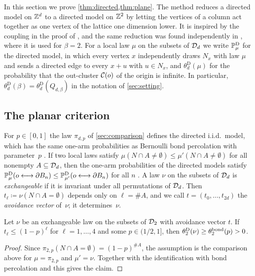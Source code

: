 \documentclass[11pt,letterpaper]{article}
\begin{document}
In this section we prove \cref{thm:directed,thm:plane}. The method reduces a directed model on $\Z^d$ to a directed model on $\Z^2$ by letting the vertices of a column act together as one vertex of the lattice one dimension lower. It is inspired by the coupling in the proof of \cite[Theorem~2.3]{JKLT25}, and the same reduction was found independently in \cite{LXZ26}, where it is used for $\beta=2$. For a local law $\mu$ on the subsets of $\cD_d$ we write $\P^{\mathrm D}_\mu$ for the directed model, in which every vertex $x$ independently draws $N_x$ with law $\mu$ and sends a directed edge to every $x+u$ with $u\in N_x$, and $\theta^{\mathrm D}_d(\mu)$ for the probability that the out-cluster $\cC(o)$ of the origin is infinite. In particular, $\theta^{\mathrm D}_d(\beta)=\theta^{\mathrm D}_d(Q_{d,\beta})$ in the notation of \cref{sec:setting}.

\subsection{The planar criterion}

For $p\in[0,1]$ the law $\pi_{d,p}$ of \cref{sec:comparison} defines the directed i.i.d.\ model, which has the same one-arm probabilities as Bernoulli bond percolation with parameter~$p$ \cite[Lemma~3.5]{BJKLRT25}. If two local laws satisfy $\mu(N\cap A\neq\emptyset)\le\mu'(N\cap A\neq\emptyset)$ for all nonempty $A\subseteq\cD_d$, then the one-arm probabilities of the directed models satisfy $\P^{\mathrm D}_\mu(o\lra\partial B_n)\le\P^{\mathrm D}_{\mu'}(o\lra\partial B_n)$ for all $n$ \cite[Theorem~2.1]{BJKLRT25}. A law $\nu$ on the subsets of $\cD_d$ is \emph{exchangeable} if it is invariant under all permutations of $\cD_d$. Then $t_\ell\coloneqq\nu(N\cap A=\emptyset)$ depends only on $\ell=\#A$, and we call $t=(t_0,\dots,t_{2d})$ the \emph{avoidance vector} of~$\nu$; it determines~$\nu$.

\begin{lemma}\label{lem:planar}
Let $\nu$ be an exchangeable law on the subsets of $\cD_2$ with avoidance vector $t$. If $t_\ell\le(1-p)^\ell$ for $\ell=1,\dots,4$ and some $p\in(1/2,1]$, then $\theta^{\mathrm D}_2(\nu)\ge\theta^{\bond}_2(p)>0$.
\end{lemma}

\begin{proof}
Since $\pi_{2,p}(N\cap A=\emptyset)=(1-p)^{\#A}$, the assumption is the comparison above for $\mu=\pi_{2,p}$ and $\mu'=\nu$. Together with the identification with bond percolation and \cite{Kes80} this gives the claim.
\end{proof}
\end{document}
